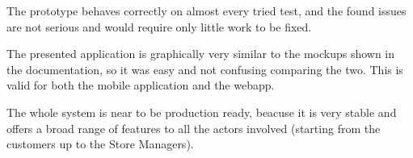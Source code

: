 The prototype behaves correctly on almost every tried test, and the found issues are not serious and would require only little work to be fixed.

The presented application is graphically very similar to the mockups shown in the documentation, so it was easy and not confusing comparing the two. This is valid for both the mobile application and the webapp.

The whole system is near to be production ready, beacuse it is very stable and offers a broad range of features to all the actors involved (starting from the customers
up to the Store Managers).